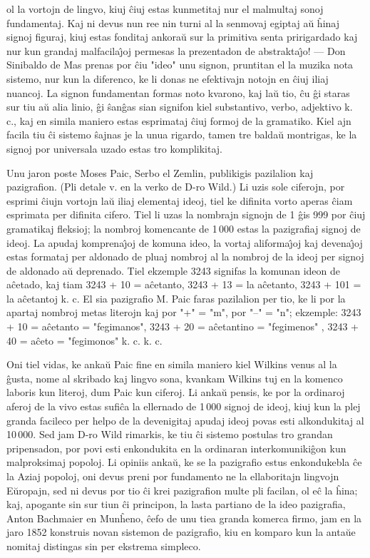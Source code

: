 ol la vortojn de lingvo, kiuj \^ciuj estas kunmetitaj nur el
malmultaj sonoj fundamentaj. Kaj ni devus nun ree nin turni al la
senmovaj egiptaj a\u u \^hinaj signoj figuraj, kiuj estas fonditaj
ankora\u u sur la primitiva senta pririgardado kaj nur kun grandaj
malfacila\^{\j}oj permesas la prezentadon de abstrakta\^{\j}o! ---
Don Sinibaldo de Mas prenas por \^ciu "ideo" unu signon, pruntitan
el la muzika nota sistemo, nur kun la diferenco, ke li donas ne
efektivajn notojn en \^ciuj iliaj nuancoj. La signon fundamentan
formas noto kvarono, kaj la\u u tio, \^cu \^gi staras sur tiu a\u u
alia linio, \^gi \^san\^gas sian signifon kiel substantivo, verbo,
adjektivo k. c., kaj en simila maniero estas esprimataj \^ciuj
formoj de la gramatiko. Kiel ajn facila tiu \^ci sistemo \^sajnas je
la unua rigardo, tamen tre balda\u u montrigas, ke la signoj por
universala uzado estas tro komplikitaj.

   Unu jaron poste Moses Paic, Serbo el Zemlin, publikigis pazilalion
kaj pazigrafion. (Pli detale v. en la verko de D-ro Wild.) Li uzis
sole ciferojn, por esprimi \^ciujn vortojn la\u u iliaj elementaj
ideoj, tiel ke difinita vorto aperas \^ciam esprimata per difinita
cifero. Tiel li uzas la nombrajn signojn de 1 \^gis 999 por \^ciuj
gramatikaj fleksioj; la nombroj komencante de 1\,000 estas la
pazigrafiaj signoj de ideoj. La apudaj komprena\^{\j}oj de komuna
ideo, la vortaj aliforma\^{\j}oj kaj devena\^{\j}oj estas formataj
per aldonado de pluaj nombroj al la nombroj de la ideoj per signoj
de aldonado a\u u deprenado. Tiel ekzemple 3243 signifas la komunan
ideon de a\^cetado, kaj tiam 3243 + 10 = a\^cetanto, 3243 + 13 = la
a\^cetanto, 3243 + 101 = la a\^cetantoj k. c. El sia pazigrafio M.
Paic faras pazilalion per tio, ke li por la apartaj nombroj metas
literojn kaj por "+" = "m", por "--" = "n"; ekzemple: 3243 +
10 = a\^cetanto = "fegimanos", 3243 + 20 = a\^cetantino =
"fegimenos" , 3243 + 40 = a\^ceto = "fegimonos" k. c. k. c.

   Oni tiel vidas, ke anka\u u Paic fine en simila maniero kiel Wilkins
venus al la \^gusta, nome al skribado kaj lingvo sona, kvankam
Wilkins tuj en la komenco laboris kun literoj, dum Paic kun ciferoj.
Li anka\u u pensis, ke por la ordinaroj aferoj de la vivo estas
sufi\^ca la ellernado de 1\,000 signoj de ideoj, kiuj kun la plej
granda facileco per helpo de la devenigitaj apudaj ideoj povas esti
alkondukitaj al 10\,000. Sed jam D-ro Wild rimarkis, ke tiu \^ci
sistemo postulas tro grandan pripensadon, por povi esti enkondukita
en la ordinaran interkomuniki\^gon kun malproksimaj popoloj. Li
opiniis anka\u u, ke se la pazigrafio estus enkondukebla \^ce la
Aziaj popoloj, oni devus preni por fundamento ne la ellaboritajn
lingvojn E\u uropajn, sed ni devus por tio \^ci krei pazigrafion
multe pli facilan, ol e\^c la \^hina; kaj, apogante sin sur tiun
\^ci principon, la lasta partiano de la ideo pazigrafia, Anton
Bachmaier en Mun\^heno, \^cefo de unu tiea granda komerca firmo, jam
en la jaro 1852 konstruis novan sistemon de pazigrafio, kiu en
komparo kun la anta\u ue nomitaj distingas sin per ekstrema
simpleco.

